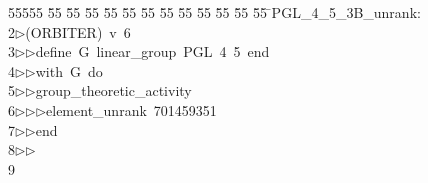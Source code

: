 %
%
\begin{tabbing}
55555 \= 55 \= 55 \= 55 \= 55 \= 55 \= 55 \= 55 \= 55 \= 55 \= 55 \= 55 \= 55 \= \>PGL\_4\_5\_3B\_unrank:\\[0pt]
2\>$\triangleright$\>(ORBITER)\ v\ 6\ \\[0pt]
3\>$\triangleright$\>$\triangleright$\>define\ G\ linear\_group\ PGL\ 4\ 5\ end\ \\[0pt]
4\>$\triangleright$\>$\triangleright$\>with\ G\ do\ \\[0pt]
5\>$\triangleright$\>$\triangleright$\>group\_theoretic\_activity\ \\[0pt]
6\>$\triangleright$\>$\triangleright$\>$\triangleright$\>element\_unrank\ 701459351\ \\[0pt]
7\>$\triangleright$\>$\triangleright$\>end\\[0pt]
8\>$\triangleright$\>$\triangleright$\>\\[0pt]
9\>\end{tabbing}
